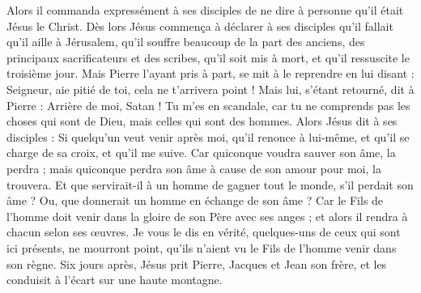 \begin{multicols}{2}
Alors il commanda expressément à ses disciples de ne dire à personne qu’il était Jésus le Christ.
Dès lors Jésus commença à déclarer à ses disciples qu'il fallait qu'il aille à Jérusalem, qu'il souffre beaucoup de la part des anciens, des principaux sacrificateurs et des scribes, qu'il soit mis à mort, et qu'il ressuscite le troisième jour.
Mais Pierre l'ayant pris à part, se mit à le reprendre en lui disant : Seigneur, aie pitié de toi, cela ne t'arrivera point !
Mais lui, s'étant retourné, dit à Pierre : Arrière de moi, Satan ! Tu m'es en scandale, car tu ne comprends pas les choses qui sont de Dieu, mais celles qui sont des hommes.
Alors Jésus dit à ses disciples : Si quelqu'un veut venir après moi, qu'il renonce à lui-même, et qu'il se charge de sa croix, et qu’il me suive.
Car quiconque voudra sauver son âme, la perdra ; mais quiconque perdra son âme à cause de son amour pour moi, la trouvera.
Et que servirait-il à un homme de gagner tout le monde, s'il perdait son âme ? Ou, que donnerait un homme en échange de son âme ?
Car le Fils de l'homme doit venir dans la gloire de son Père avec ses anges ; et alors il rendra à chacun selon ses œuvres.
Je vous le dis en vérité, quelques-uns de ceux qui sont ici présents, ne mourront point, qu’ils n’aient vu le Fils de l'homme venir dans son règne.
\VerseOne{}Six jours après, Jésus prit Pierre, Jacques et Jean son frère, et les conduisit à l'écart sur une haute montagne.

\end{multicols}
